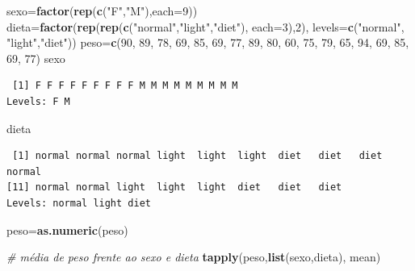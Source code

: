 \documentclass[12pt,brazil,]{book}
\newenvironment{Shaded}{\begin{snugshade}}{\end{snugshade}}
\newcommand{\CommentTok}[1]{\textcolor[rgb]{0.56,0.35,0.01}{\textit{#1}}}
\newcommand{\DataTypeTok}[1]{\textcolor[rgb]{0.13,0.29,0.53}{#1}}
\newcommand{\DecValTok}[1]{\textcolor[rgb]{0.00,0.00,0.81}{#1}}
\newcommand{\KeywordTok}[1]{\textcolor[rgb]{0.13,0.29,0.53}{\textbf{#1}}}
\newcommand{\NormalTok}[1]{#1}
\newcommand{\StringTok}[1]{\textcolor[rgb]{0.31,0.60,0.02}{#1}}
\begin{document}
\begin{Shaded}
\begin{Highlighting}[]
\NormalTok{sexo=}\KeywordTok{factor}\NormalTok{(}\KeywordTok{rep}\NormalTok{(}\KeywordTok{c}\NormalTok{(}\StringTok{"F"}\NormalTok{,}\StringTok{"M"}\NormalTok{),}\DataTypeTok{each=}\DecValTok{9}\NormalTok{))}
\NormalTok{dieta=}\KeywordTok{factor}\NormalTok{(}\KeywordTok{rep}\NormalTok{(}\KeywordTok{rep}\NormalTok{(}\KeywordTok{c}\NormalTok{(}\StringTok{"normal"}\NormalTok{,}\StringTok{"light"}\NormalTok{,}\StringTok{"diet"}\NormalTok{), }\DataTypeTok{each=}\DecValTok{3}\NormalTok{),}\DecValTok{2}\NormalTok{), }
\DataTypeTok{levels=}\KeywordTok{c}\NormalTok{(}\StringTok{"normal"}\NormalTok{, }\StringTok{"light"}\NormalTok{,}\StringTok{"diet"}\NormalTok{))}
\NormalTok{peso=}\KeywordTok{c}\NormalTok{(}\DecValTok{90}\NormalTok{, }\DecValTok{89}\NormalTok{, }\DecValTok{78}\NormalTok{, }\DecValTok{69}\NormalTok{, }\DecValTok{85}\NormalTok{, }\DecValTok{69}\NormalTok{, }\DecValTok{77}\NormalTok{, }\DecValTok{89}\NormalTok{, }\DecValTok{80}\NormalTok{, }\DecValTok{60}\NormalTok{, }\DecValTok{75}\NormalTok{, }\DecValTok{79}\NormalTok{, }\DecValTok{65}\NormalTok{, }\DecValTok{94}\NormalTok{,}
       \DecValTok{69}\NormalTok{, }\DecValTok{85}\NormalTok{, }\DecValTok{69}\NormalTok{, }\DecValTok{77}\NormalTok{)}
\NormalTok{sexo}
\end{Highlighting}
\end{Shaded}

\begin{verbatim}
 [1] F F F F F F F F F M M M M M M M M M
Levels: F M
\end{verbatim}

\begin{Shaded}
\begin{Highlighting}[]
\NormalTok{dieta}
\end{Highlighting}
\end{Shaded}

\begin{verbatim}
 [1] normal normal normal light  light  light  diet   diet   diet   normal
[11] normal normal light  light  light  diet   diet   diet  
Levels: normal light diet
\end{verbatim}

\begin{Shaded}
\begin{Highlighting}[]
\NormalTok{peso=}\KeywordTok{as.numeric}\NormalTok{(peso)}

\CommentTok{# média de peso frente ao sexo e dieta}
\KeywordTok{tapply}\NormalTok{(peso,}\KeywordTok{list}\NormalTok{(sexo,dieta), mean)}
\end{Highlighting}
\end{Shaded}
\end{document}
